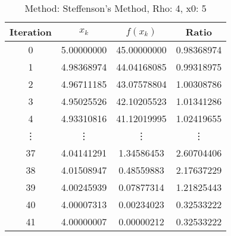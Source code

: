 \begin{table}
\centering
\caption{Method: Steffenson's Method, Rho: 4, x0: 5}
\label{tab:table_Steffenson's_Method_4_5}
\begin{tabular}{c c c c}
\toprule
Iteration &      $x_k$ &    $f(x_k)$ &      Ratio \\
\midrule
        0 & 5.00000000 & 45.00000000 & 0.98368974 \\
        1 & 4.98368974 & 44.04168085 & 0.99318975 \\
        2 & 4.96711185 & 43.07578804 & 1.00308786 \\
        3 & 4.95025526 & 42.10205523 & 1.01341286 \\
        4 & 4.93310816 & 41.12019995 & 1.02419655 \\
   \vdots &     \vdots &      \vdots &     \vdots \\
       37 & 4.04141291 &  1.34586453 & 2.60704406 \\
       38 & 4.01508947 &  0.48559883 & 2.17637229 \\
       39 & 4.00245939 &  0.07877314 & 1.21825443 \\
       40 & 4.00007313 &  0.00234023 & 0.32533222 \\
       41 & 4.00000007 &  0.00000212 & 0.32533222 \\
\bottomrule
\end{tabular}
\end{table}
